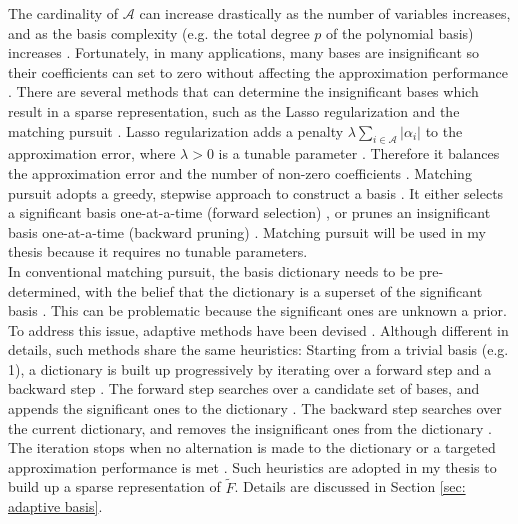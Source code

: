 The cardinality of $\mathcal{A}$ can increase drastically as the number of variables increases, and
as the basis complexity (e.g. the total degree $p$ of the polynomial basis) increases \cite{PCE}.
Fortunately, in many applications, 
many bases are insignificant so their coefficients can set to zero without affecting the approximation 
performance \cite{match pursuit}. 
There are several methods that can determine the insignificant bases which result 
in a sparse representation, such as the Lasso regularization 
\cite{Lasso variable selection} and the matching 
pursuit \cite{match pursuit}. Lasso regularization adds a penalty $\lambda
\sum_{i\in\mathcal{A}}|\alpha_i|$
to the approximation error, where $\lambda>0$ is a tunable parameter \cite{Lasso variable selection}. 
Therefore it balances the approximation error and the number of non-zero
coefficients \cite{Lasso variable selection}.
Matching pursuit adopts a greedy, stepwise approach to construct a basis \cite{match pursuit}.
It either selects a significant basis one-at-a-time (forward selection) \cite{forward selection},
or prunes an insignificant basis one-at-a-time (backward pruning) \cite{backward prune}.
Matching pursuit will be used in my thesis because it requires no tunable parameters. \\

In conventional matching pursuit, the basis dictionary needs to
be pre-determined, with the belief that the dictionary is a superset of the significant basis
\cite{adaptive basis 2}. 
This can be problematic because the significant ones are unknown a prior.
To address this issue, adaptive methods have been devised 
\cite{adaptive basis 1, adaptive basis 2, adaptive basis 3}.
Although different in details, such methods share the same heuristics: Starting from a trivial
basis (e.g. 1), a dictionary is built up progressively 
by iterating over a forward step and a backward step
\cite{adaptive basis 1, adaptive basis 2, adaptive basis 3}.
The forward step searches over a candidate set of bases, and appends the significant ones 
to the dictionary
\cite{adaptive basis 1, adaptive basis 2, adaptive basis 3}.
The backward step searches over the current dictionary, and removes the 
insignificant ones from the dictionary
\cite{adaptive basis 1, adaptive basis 2, adaptive basis 3}.
The iteration stops when no alternation is made to the dictionary or a targeted approximation
performance is met 
\cite{adaptive basis 1, adaptive basis 2, adaptive basis 3}.
Such heuristics are adopted in my thesis to build up 
a sparse representation of $\tilde{F}$. Details are discussed in Section \ref{sec: adaptive basis}.\\


